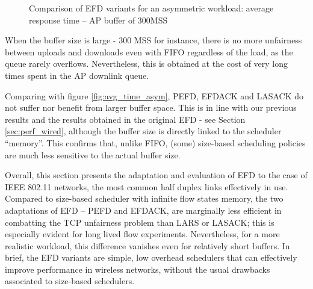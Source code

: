 \documentclass[preprint,12pt]{elsarticle}
\begin{document}
\begin{figure}[ht!]
  \centering
  \caption{Comparison of EFD variants for an asymmetric workload: average response time --  AP buffer of 300MSS}
  \label{fig:asym_buffer}
\end{figure}

When the buffer size is large - 300 MSS for instance, there is no more unfairness between uploads and downloads even with FIFO regardless of the load, as the queue rarely overflows. Nevertheless, this is obtained at the cost of very long times spent in the AP downlink queue. 

Comparing with figure \ref{fig:avg_time_asym}, PEFD, EFDACK and LASACK do not suffer nor benefit from larger buffer space. This is in line with our previous results and the results obtained in the original EFD - see Section \ref{sec:perf_wired}, although the buffer size is directly linked to the scheduler ``memory''. This confirms that, unlike FIFO, (some) size-based scheduling policies are much less sensitive to the actual buffer size. 

Overall, this section presents the adaptation and evaluation of EFD to the case of IEEE 802.11 networks, the most common half duplex links effectively in use. Compared to size-based scheduler with infinite flow states memory, the two adaptations of EFD -- PEFD and EFDACK, are marginally less efficient in combatting the TCP unfairness problem than LARS or LASACK; this is especially evident for long lived flow experiments. Nevertheless, for a more realistic workload,  this difference vanishes even for relatively short buffers. In brief, the EFD variants are simple, low overhead  schedulers that can effectively improve performance in wireless networks, without the usual drawbacks associated to size-based schedulers.
\end{document}
